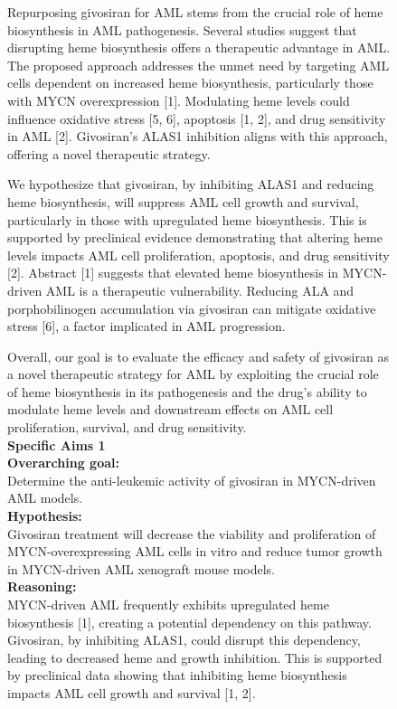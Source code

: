 \begin{figure}[htbp!]
\begin{tcolorbox}[title=Givosiran for AML]
Repurposing givosiran for AML stems from the crucial role of heme biosynthesis in AML pathogenesis.  Several studies suggest that disrupting heme biosynthesis offers a therapeutic advantage in AML. The proposed approach addresses the unmet need by targeting AML cells dependent on increased heme biosynthesis, particularly those with MYCN overexpression [1]. Modulating heme levels could influence oxidative stress [5, 6], apoptosis [1, 2], and drug sensitivity in AML [2]. Givosiran's ALAS1 inhibition aligns with this approach, offering a novel therapeutic strategy.

We hypothesize that givosiran, by inhibiting ALAS1 and reducing heme biosynthesis, will suppress AML cell growth and survival, particularly in those with upregulated heme biosynthesis. This is supported by preclinical evidence demonstrating that altering heme levels impacts AML cell proliferation, apoptosis, and drug sensitivity [2]. Abstract [1] suggests that elevated heme biosynthesis in MYCN-driven AML is a therapeutic vulnerability.  Reducing ALA and porphobilinogen accumulation via givosiran can mitigate oxidative stress [6], a factor implicated in AML progression.

Overall, our goal is to evaluate the efficacy and safety of givosiran as a novel therapeutic strategy for AML by exploiting the crucial role of heme biosynthesis in its pathogenesis and the drug's ability to modulate heme levels and downstream effects on AML cell proliferation, survival, and drug sensitivity.\\

\textbf{Specific Aims 1}\\
\textbf{Overarching goal:}\\
Determine the anti-leukemic activity of givosiran in MYCN-driven AML models.\\
\textbf{Hypothesis:}\\
Givosiran treatment will decrease the viability and proliferation of MYCN-overexpressing AML cells in vitro and reduce tumor growth in MYCN-driven AML xenograft mouse models.\\
\textbf{Reasoning:}\\
MYCN-driven AML frequently exhibits upregulated heme biosynthesis [1], creating a potential dependency on this pathway. Givosiran, by inhibiting ALAS1, could disrupt this dependency, leading to decreased heme and growth inhibition. This is supported by preclinical data showing that inhibiting heme biosynthesis impacts AML cell growth and survival [1, 2].\\
\end{tcolorbox}
\end{figure}

